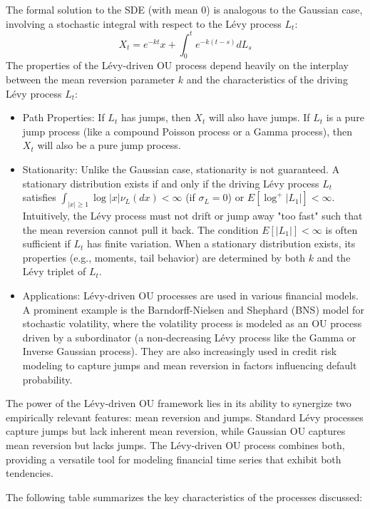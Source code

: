 \documentclass[11pt,twoside,openright]{report}
\begin{document}
The formal solution to the SDE (with mean 0) is analogous to the Gaussian case, involving a stochastic integral with respect to the Lévy process $L_t$:
\begin{equation}
X_t = e^{-k t} x + \int_0^t e^{-k(t-s)} dL_s
\label{eq:levy_ou_solution}
\end{equation}
The properties of the Lévy-driven OU process depend heavily on the interplay between the mean reversion parameter $k$ and the characteristics of the driving Lévy process $L_t$:
\begin{itemize}
    \item Path Properties: If $L_t$ has jumps, then $X_t$ will also have jumps. If $L_t$ is a pure jump process (like a compound Poisson process or a Gamma process), then $X_t$ will also be a pure jump process.
    \item Stationarity: Unlike the Gaussian case, stationarity is not guaranteed. A stationary distribution exists if and only if the driving Lévy process $L_t$ satisfies $\int_{|x| \ge 1} \log |x| \nu_L(dx) < \infty$ (if $\sigma_L = 0$) or $E[\log^+ |L_1|] < \infty$. Intuitively, the Lévy process must not drift or jump away "too fast" such that the mean reversion cannot pull it back. The condition $E[|L_1|] < \infty$ is often sufficient if $L_t$ has finite variation. When a stationary distribution exists, its properties (e.g., moments, tail behavior) are determined by both $k$ and the Lévy triplet of $L_t$.
    \item Applications: Lévy-driven OU processes are used in various financial models. A prominent example is the Barndorff-Nielsen and Shephard (BNS) model for stochastic volatility, where the volatility process is modeled as an OU process driven by a subordinator (a non-decreasing Lévy process like the Gamma or Inverse Gaussian process). They are also increasingly used in credit risk modeling to capture jumps and mean reversion in factors influencing default probability.
\end{itemize}
The power of the Lévy-driven OU framework lies in its ability to synergize two empirically relevant features: mean reversion and jumps. Standard Lévy processes capture jumps but lack inherent mean reversion, while Gaussian OU captures mean reversion but lacks jumps. The Lévy-driven OU process combines both, providing a versatile tool for modeling financial time series that exhibit both tendencies.

The following table summarizes the key characteristics of the processes discussed:
\end{document}
